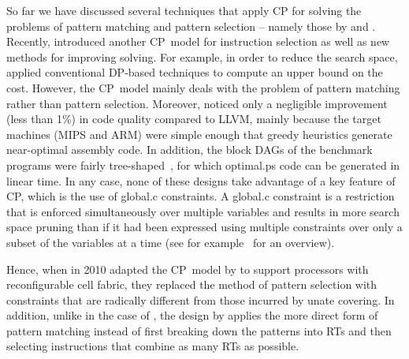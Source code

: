 So far we have discussed several techniques that apply \glsdesc{CP} for solving
the problems of \gls{pattern matching} and \gls{pattern selection} -- namely
those by \citeauthor{Bashford1999} and \citeauthor{Martin2009}.
%
Recently, \textcite{Beg2013} introduced another \gls{CP}~model for
\gls{instruction selection} as well as new methods for improving solving.
%
For example, in order to reduce the search space, \citeauthor{Beg2013} applied
conventional \gls{DP}-based techniques to compute an upper bound on the cost.
%
However, the \gls{CP}~model mainly deals with the problem of \gls{pattern
  matching} rather than \gls{pattern selection}.
%
Moreover, \citeauthor{Beg2013} noticed only a negligible improvement (less than
1\%) in code quality compared to \gls{LLVM}, mainly because the \glspl{target
  machine} (\gls{MIPS} and \gls{ARM}) were simple enough that greedy heuristics
generate near-optimal \gls{assembly code}.  In addition, the \glspl{block DAG}
of the benchmark \glspl{program} were fairly
\gls{tree}-shaped~\cite{VanBeek2014}, for which \gls{optimal.ps} code can be
generated in linear time.
%
In any case, none of these designs take advantage of a key feature of
\glsdesc{CP}, which is the use of \gls{global.c} \glspl{constraint}.
%
A \gls{global.c} \gls{constraint} is a restriction that is enforced
simultaneously over multiple \glspl{variable} and results in more search space
pruning than if it had been expressed using multiple \glspl{constraint} over
only a subset of the variables at a time (see for example~\cite{Beldiceanu2014}
for an overview).

Hence, when \textcite{Floch2010} in 2010 adapted the \gls{CP}~model by
\citeauthor{Martin2009} to support processors with reconfigurable cell fabric,
they replaced the method of \gls{pattern selection} with \glspl{constraint} that
are radically different from those incurred by \gls{unate covering}.
%
In addition, unlike in the case of \citeauthor{Bashford1999}, the design by
\citeauthor{Floch2010} applies the more direct form of \gls{pattern matching}
instead of first breaking down the \glspl{pattern} into \glspl{RT} and then
selecting \glspl{instruction} that combine as many \glspl{RT} as possible.

